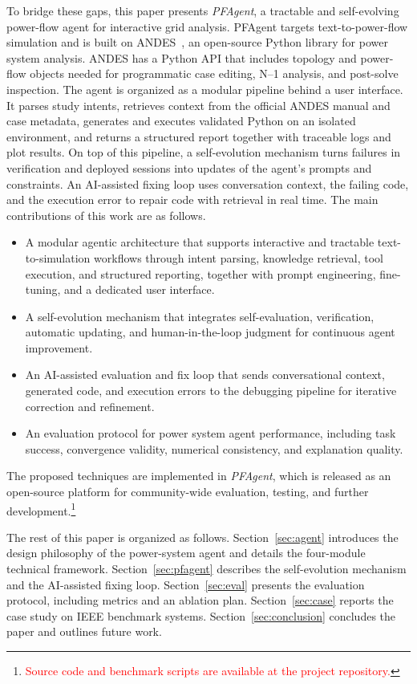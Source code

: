 \documentclass[journal]{IEEEtran}
\begin{document}
To bridge these gaps, this paper presents \emph{PFAgent}, a tractable
and self-evolving power-flow agent for interactive grid analysis.
PFAgent targets text-to-power-flow simulation and is built on
ANDES~\cite{cui2021hybrid}, an open-source Python library for power
system analysis. ANDES has a Python API that includes topology and power-flow objects needed for programmatic case editing, N--1 analysis, and post-solve inspection.
The agent is organized as a modular pipeline behind a user
interface. It parses study intents, retrieves context from the
official ANDES manual and case metadata, generates and executes
validated Python on an isolated environment, and returns a structured
report together with traceable logs and plot results.
On top of this pipeline, a self-evolution mechanism turns failures in verification and deployed sessions into updates of
the agent's prompts and constraints. 
An AI-assisted fixing loop uses conversation context, the failing code, and the execution error to repair code with retrieval in real time.
The main contributions of this work are as follows.
\begin{itemize}
    \item A modular agentic architecture that supports interactive and tractable text-to-simulation workflows through intent parsing, knowledge retrieval, tool execution, and structured reporting, together with prompt engineering, fine-tuning, and a dedicated user interface.
    \item A self-evolution mechanism that integrates self-evaluation, verification, automatic updating, and human-in-the-loop judgment for continuous agent improvement.
    \item An AI-assisted evaluation and fix loop that sends
    conversational context, generated code, and execution errors to the debugging pipeline for iterative correction and refinement.
    \item An evaluation protocol for power system agent performance, including task success, convergence validity, numerical consistency, and explanation quality.
\end{itemize}

The proposed techniques are implemented in \emph{PFAgent}, which is
released as an open-source platform for community-wide evaluation,
testing, and further development.\footnote{
\textcolor{red}{Source code and benchmark scripts are available at the project repository.}
}

The rest of this paper is organized as follows.
Section~\ref{sec:agent} introduces the design philosophy of the power-system agent and details the four-module technical framework.
Section~\ref{sec:pfagent} describes the self-evolution mechanism and the AI-assisted fixing loop.
Section~\ref{sec:eval} presents the evaluation protocol, including metrics and an ablation plan.
Section~\ref{sec:case} reports the case study on IEEE benchmark systems.
Section~\ref{sec:conclusion} concludes the paper and outlines future work.
\end{document}
